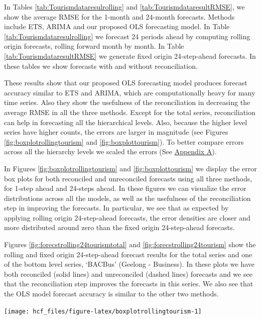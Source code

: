 \documentclass[11pt,a4paper,]{article}
\let\origfigure\figure
\let\endorigfigure\endfigure
\renewenvironment{figure}[1][2] {
    \expandafter\origfigure\expandafter[!htbp]
} {
    \endorigfigure
}
\begin{document}
In Tables \ref{tab:Tourismdataresulrolling} and
\ref{tab:TourismdataresultRMSE}, we show the average RMSE for the
1-month and 24-month forecasts. Methods include ETS, ARIMA and our
proposed OLS forecasting model. In Table
\ref{tab:Tourismdataresulrolling} we forecast 24 periods ahead by
computing rolling origin forecasts, rolling forward month by month. In
Table \ref{tab:TourismdataresultRMSE} we generate fixed origin
24-step-ahead forecasts. In these tables we show forecasts with and
without reconciliation.

These results show that our proposed OLS forecasting model produces
forecast accuracy similar to ETS and ARIMA, which are computationally
heavy for many time series. Also they show the usefulness of the
reconciliation in decreasing the average RMSE in all the three methods.
Except for the total series, reconciliation can help in forecasting all
the hierarchical levels. Also, because the higher level series have
higher counts, the errors are larger in magnitude (see Figures
\ref{fig:boxplotrollingtourism} and \ref{fig:boxplottourism}). To better
compare errors across all the hierarchy levels we scaled the errors (See
\protect\hyperlink{appendixA}{Appendix A}).

In Figures \ref{fig:boxplotrollingtourism} and \ref{fig:boxplottourism}
we display the error box plots for both reconciled and unreconciled
forecasts using all three methods, for 1-step ahead and 24-steps ahead.
In these figures we can visualize the error distributions across all the
models, as well as the usefulness of the reconciliation step in
improving the forecasts. In particular, we see that as expected by
applying rolling origin 24-step-ahead forecasts, the error densities are
closer and more distributed around zero than the fixed origin
24-step-ahead forecasts.

Figures \ref{fig:forecstrolling24tourismtotal} and
\ref{fig:forecstrolling24tourism} show the rolling and fixed origin
24-step-ahead forecast results for the total series and one of the
bottom level series, `BACBus' (Geelong - Business). In these plots we
have both reconciled (solid lines) and unreconciled (dashed lines)
forecasts and we see that the reconciliation step improves the forecasts
in this series. We also see that the OLS model forecast accuracy is
similar to the other two methods.

\begin{figure}

{\centering \texttt{[image: hcf\_files/figure-latex/boxplotrollingtourism-1]} 

}

\caption{Box plots of forecast errors from reconciled and unreconciled ETS, ARIMA and OLS methods at each hierarchical level for rolling origin 24-step-ahead tourism demand.}\label{fig:boxplotrollingtourism}
\end{figure}
\end{document}
